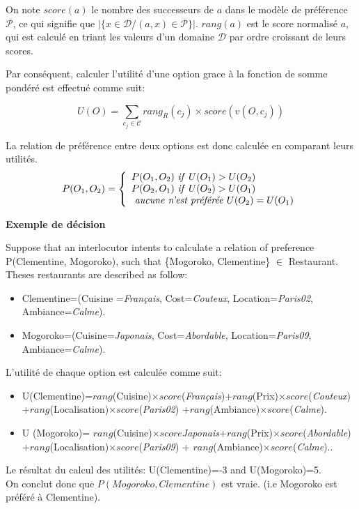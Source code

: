 \documentclass[a4paper,french]{article}
\begin{document}
\par On note  $score(a)$ le nombre des successeurs de  $a$  dans le modèle de préférence $\mathcal{P}$, ce qui signifie que $|\{x \in \mathcal{D} / (a,x) \in \mathcal{P}\}|$. 
$rang(a)$ est le score normalisé $a$, qui est calculé en triant les valeurs d'un domaine $\mathcal{D}$ par ordre croissant de leurs scores. 


Par conséquent, calculer l'utilité d'une option grace à la fonction de somme pondéré est effectué comme suit:

\[U(O) = \sum_{c_j \in \mathcal{C}}  rang_R(c_j) \times score\left( v(O, c_j) \right) \] 


\par La relation de préférence entre deux options est donc calculée en comparant leurs utilités. 
\[ P(O_1, O_2)  = \left \{
\begin{array}{l}
P(O_1, O_2)$ \textit{if}  $U(O_1) > U(O_2) \\
P(O_2, O_1)$  \textit{if}  $U(O_2) > U(O_1) \\
$  \textit{aucune n'est préférée}  $U(O_2) = U(O_1)\\
\end{array}
\right .\]

 \par \textbf{Exemple de décision}

Suppose that an interlocutor intents to calculate a relation of preference  P(Clementine, Mogoroko), such that 
\{Mogoroko, Clementine\} $\in$ Restaurant. Theses restaurants are described as follow: 
\begin{itemize}
	\item Clementine=(Cuisine =\textit{Français}, Cost=\textit{Couteux}, Location=\textit{Paris02},
	\\Ambiance=\textit{Calme}).
	\item Mogoroko=(Cuisine=\textit{Japonais}, Cost=\textit{Abordable}, Location=\textit{Paris09}, 
	\\Ambiance=\textit{Calme}).
\end{itemize}

L'utilité de chaque option est calculée comme suit:
\begin{itemize}
	\item U(Clementine)=$rang$(Cuisine)$\times score$(\textit{Français})+$rang$(Prix)$\times score$(\textit{Couteux})\\+$rang$(Localisation)$\times score$(\textit{Paris02})
	+$rang$(Ambiance)$\times score$(\textit{Calme}).
	\item U (Mogoroko)= $rang$(Cuisine)$\times score$\textit{Japonais}+$rang$(Prix)$\times score$(\textit{Abordable})\\+$rang$(Localisation)$\times score$(\textit{Paris09}) +  
	$rang$(Ambiance)$\times score$(\textit{Calme})..
\end{itemize}
Le résultat du calcul des utilités: U(Clementine)=-3 and U(Mogoroko)=5.
\\  On conclut donc que $P(Mogoroko, Clementine)$ est vraie.
(i.e Mogoroko est préféré à Clementine).
\end{document}
